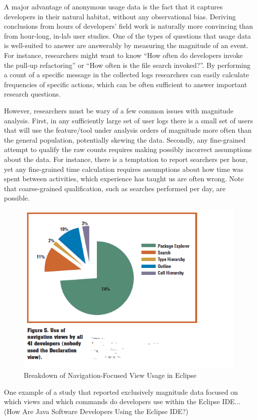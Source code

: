 

A major advantage of anonymous usage data is the fact that it captures developers in their natural habitat, without any observational bias. Deriving conclusions from hours of developers' field work is naturally more convincing than from hour-long, in-lab user studies. One of the types of questions that usage data is well-suited to answer are answerably by measuring the magnitude of an event. For instance, researchers might want to know ``How often do developers invoke the pull-up refactoring'' or ``How often is the file search invoked?''. By performing a count of a specific message in the collected logs researchers can easily calculate frequencies of specific actions, which can be often sufficient to answer important research questions. 

However, researchers must be wary of a few common issues with magnitude analysis. First, in any sufficiently large set of user logs there is a small set of users that will use the feature/tool under analysis orders of magnitude more often than the general population, potentially skewing the data. Secondly, any fine-grained attempt to qualify the raw counts requires making possibly incorrect assumptions about the data. For instance, there is a temptation to report searchers per hour, yet any fine-grained time calculation requires assumptions about how time was spent between activities, which experience has taught us are often wrong. Note that coarse-grained qualification, such as searches performed per day, are possible.   


\begin{figure}
  \centering
  \includegraphics{AnalyzingUsageData/eclipse}
  \caption{Breakdown of Navigation-Focused View Usage in Eclipse}\label{fig:eclipse}
\end{figure}

One example of a study that reported exclusively magnitude data focused on which views and which commands do developers use within the Eclipse IDE... (How Are Java Software Developers Using the Eclipse IDE?)